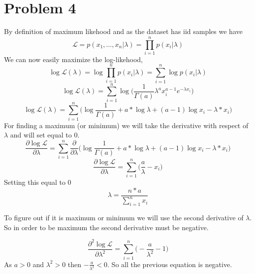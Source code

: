 \section{Problem 4}
By definition of maximum likehood and as the dataset has iid samples we have\\
\begin{equation*}
\mathcal{L} = p(x_1,\dots,x_n|\lambda) = \prod_{i=1}^n p(x_i|\lambda)
\end{equation*}
We can now easily maximize the log-likehood, 
\begin{equation*}
\log \mathcal{L}(\lambda) = \log\prod_{i=1}^n p(x_i|\lambda)=\sum_{i=1}^n \log p(x_i|\lambda)
\end{equation*}
\begin{equation*}
\log \mathcal{L}(\lambda) = \sum_{i=1}^n \log \biggl( \frac{1}{\Gamma(a)} \lambda^a x_i^{a-1} e^{-\lambda x_i} \biggr)
\end{equation*}
\begin{equation*}
\log \mathcal{L}(\lambda) = \sum_{i=1}^n \biggl( \log\frac{1}{\Gamma(a)} + a*\log\lambda + (a-1)\log{x_i} - \lambda*x_i \biggr)
\end{equation*}
For finding a maximum (or minimum) we will take the derivative with respect of $\lambda$ and will set equal to 0.
\begin{equation*}
\frac{\partial\log\mathcal{L}}{\partial\lambda} = \sum_{i=1}^n \frac{\partial}{\partial\lambda} \biggl( \log\frac{1}{\Gamma(a)} + a*\log\lambda + (a-1)\log{x_i} - \lambda*x_i \biggr)
\end{equation*}
\begin{equation*}
\frac{\partial\log\mathcal{L}}{\partial\lambda} = \sum_{i=1}^n \biggl( \frac{a}{\lambda} - x_i \biggr)
\end{equation*}
Setting this equal to 0
\begin{equation*}
\lambda = \frac{n*a}{\sum_{i=1}^n x_i}
\end{equation*}

To figure out if it is maximum or minimum we will use the second derivative of $\lambda$.
So in order to be maximum the second derivative must be negative.

\begin{equation*}
\frac{\partial^2\log\mathcal{L}}{\partial\lambda^2} = \sum_{i=1}^n \biggl( -\frac{a}{\lambda^2} -1 \biggr)
\end{equation*}
As $ a > 0 $ and $\lambda^2 > 0$ then $-\frac{a}{\lambda^2} < 0$. So all the previous equation is negative.
